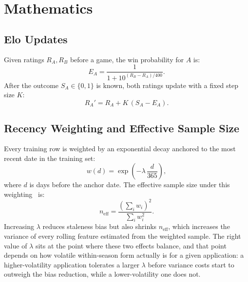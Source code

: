 \documentclass[conference]{IEEEtran}
\begin{document}
\section{Mathematics}
\label{sec:math}

\subsection{Elo Updates}

Given ratings $R_A, R_B$ before a game, the win probability for $A$ is:
\begin{equation}
  E_A = \frac{1}{1 + 10^{(R_B - R_A)/400}}.
\label{eq:elo-expected}
\end{equation}
After the outcome $S_A \in \{0,1\}$ is known, both ratings update with
a fixed step size $K$:
\begin{equation}
  R_A' = R_A + K\,(S_A - E_A).
\label{eq:elo-update}
\end{equation}

\subsection{Recency Weighting and Effective Sample Size}
\label{sec:decay-math}

Every training row is weighted by an exponential decay anchored to the
most recent date in the training set:
\begin{equation}
  w(d) = \exp\!\left(-\lambda \, \frac{d}{365}\right),
\label{eq:decay}
\end{equation}
where $d$ is days before the anchor date. The effective sample size
under this weighting~\cite{kish1965} is:
\begin{equation}
  n_{\text{eff}} = \frac{\left(\sum_i w_i\right)^2}{\sum_i w_i^2}.
\label{eq:kish}
\end{equation}
Increasing $\lambda$ reduces staleness bias but also shrinks
$n_{\text{eff}}$, which increases the variance of every rolling
feature estimated from the weighted sample. The right value of
$\lambda$ sits at the point where these two effects balance, and that
point depends on how volatile within-season form actually is for a
given application: a higher-volatility application tolerates a larger
$\lambda$ before variance costs start to outweigh the bias reduction,
while a lower-volatility one does not.
\end{document}
